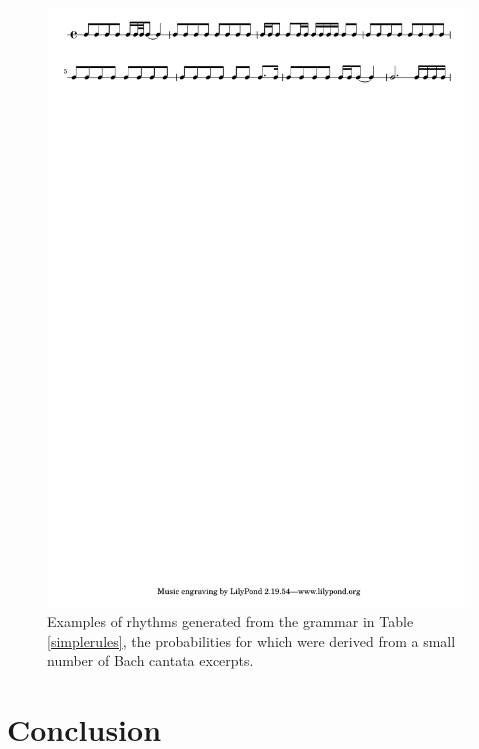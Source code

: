 \documentclass{article}
\begin{document}
\begin{figure}[t] %
\centering
\includegraphics[width=16cm]{bach_output.pdf}
\caption{Examples of rhythms generated from the grammar in Table \ref{simplerules}, the probabilities for which were derived from a small number of Bach cantata excerpts.}\label{learninggen}
\end{figure}



\section{Conclusion}
\end{document}
